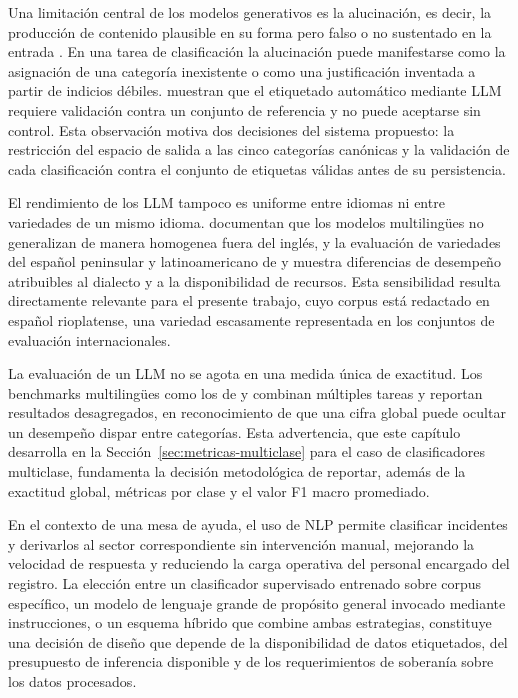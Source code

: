 Una limitación central de los modelos generativos es la alucinación, es decir, la producción de contenido plausible en su forma pero falso o no sustentado en la entrada \parencite{Ji2023_hallucination}. En una tarea de clasificación la alucinación puede manifestarse como la asignación de una categoría inexistente o como una justificación inventada a partir de indicios débiles. \textcite{colavito2025benchmarking} muestran que el etiquetado automático mediante LLM requiere validación contra un conjunto de referencia y no puede aceptarse sin control. Esta observación motiva dos decisiones del sistema propuesto: la restricción del espacio de salida a las cinco categorías canónicas y la validación de cada clasificación contra el conjunto de etiquetas válidas antes de su persistencia.

El rendimiento de los LLM tampoco es uniforme entre idiomas ni entre variedades de un mismo idioma. \textcite{zhang2023multilingual} documentan que los modelos multilingües no generalizan de manera homogenea fuera del inglés, y la evaluación de variedades del español peninsular y latinoamericano de \textcite{grandury2025laleaderboard} y \textcite{mayorrocher2026spanish} muestra diferencias de desempeño atribuibles al dialecto y a la disponibilidad de recursos. Esta sensibilidad resulta directamente relevante para el presente trabajo, cuyo corpus está redactado en español rioplatense, una variedad escasamente representada en los conjuntos de evaluación internacionales.

La evaluación de un LLM no se agota en una medida única de exactitud. Los benchmarks multilingües como los de \textcite{xuan2025mmluprox} y \textcite{ahuja2023mega} combinan múltiples tareas y reportan resultados desagregados, en reconocimiento de que una cifra global puede ocultar un desempeño dispar entre categorías. Esta advertencia, que este capítulo desarrolla en la Sección~\ref{sec:metricas-multiclase} para el caso de clasificadores multiclase, fundamenta la decisión metodológica de reportar, además de la exactitud global, métricas por clase y el valor F1 macro promediado.

En el contexto de una mesa de ayuda, el uso de NLP permite clasificar incidentes y derivarlos al sector correspondiente sin intervención manual, mejorando la velocidad de respuesta y reduciendo la carga operativa del personal encargado del registro. La elección entre un clasificador supervisado entrenado sobre corpus específico, un modelo de lenguaje grande de propósito general invocado mediante instrucciones, o un esquema híbrido que combine ambas estrategias, constituye una decisión de diseño que depende de la disponibilidad de datos etiquetados, del presupuesto de inferencia disponible y de los requerimientos de soberanía sobre los datos procesados.

